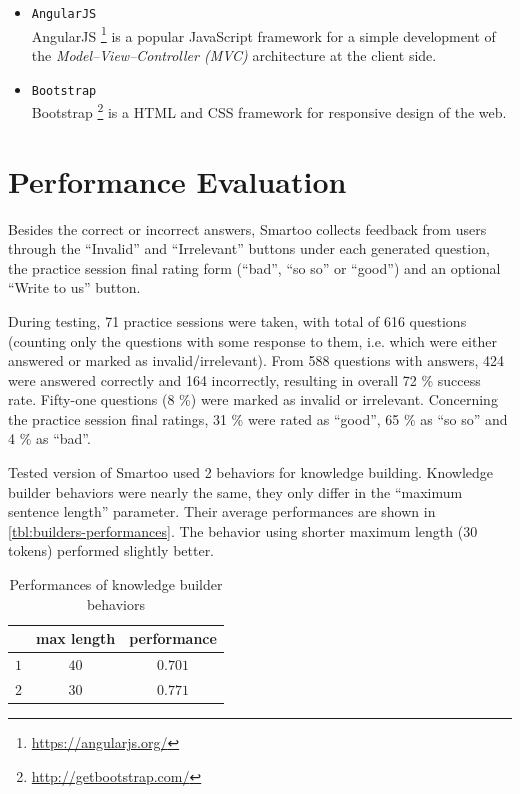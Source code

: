 \documentclass[12pt, twoside]{fithesis2}
\renewcommand{\_}{\leavevmode \kern0.07em\vbox{\hrule width0.4em}}
\newcommand{\squarebullet}{\textcolor{black}{\raisebox{0.15em}{\rule{4pt}{4pt}}}}
\newcommand{\emptysquarebullet}{\textcolor{black}{\raisebox{0.10em}{\tiny$\square$}}}
\newenvironment{myItemize}{
  \begin{itemize}[leftmargin=2em,rightmargin=1em,itemsep=\parskip ,parsep=0em,topsep=0em,partopsep=0em]
  \renewcommand{\labelitemi}{\squarebullet}
  \renewcommand{\labelitemii}{\textbullet}
}{
  \end{itemize}
}
\begin{document}
\begin{myItemize}
\item \texttt{AngularJS}\\
AngularJS%
\footnote{\url{https://angularjs.org/}}
is a popular JavaScript framework for a simple development of the \emph{Model--View--Controller (MVC)} architecture at the client side.

\item \texttt{Bootstrap}\\
Bootstrap%
\footnote{\url{http://getbootstrap.com/}}
is a HTML and CSS framework for responsive design of the web.
\end{myItemize}





\section{Performance Evaluation}
\label{sec:performance-evaluation}

Besides the correct or incorrect answers, Smartoo collects feedback from users through
the ``Invalid'' and ``Irrelevant'' buttons under each generated question,
the practice session final rating form (``bad'', ``so so'' or ``good'')
and an optional ``Write to us'' button.

During testing, 71 practice sessions were taken, with total of 616 questions
(counting only the questions with some response to them, i.e. which were either answered or marked as invalid/irrelevant).
From 588 questions with answers, 424 were answered correctly and 164 incorrectly,
resulting in overall 72 \% success rate.
Fifty-one questions (8 \%) were marked as invalid or irrelevant.
Concerning the practice session final ratings, 31 \% were rated as ``good'', 65 \% as ``so so'' and 4 \% as ``bad''.

Tested version of Smartoo used 2 behaviors for knowledge building.
Knowledge builder behaviors were nearly the same, they only differ in the ``maximum sentence length'' parameter.
Their average performances are shown in \autoref{tbl:builders-performances}.
The behavior using shorter maximum length (30 tokens) performed slightly better.

\begin{table}[h]
\begin{center}
\begin{tabular}{| c | c | c |}
  \hline
      & max length & performance\\
  \hline
  $1$ & $40$ & $0.701$\\
  $2$ & $30$ & $0.771$\\
  \hline
\end{tabular}
\end{center}
\caption{Performances of knowledge builder behaviors}
\label{tbl:builders-performances}
\end{table}
\end{document}
